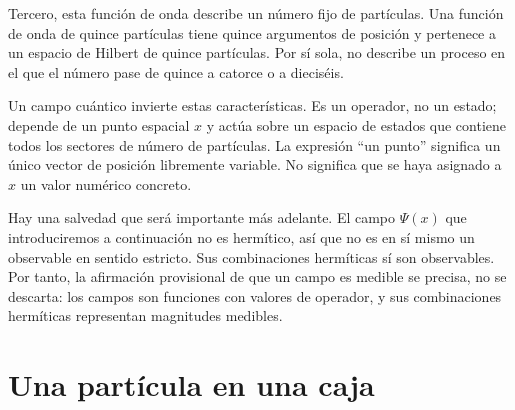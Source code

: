 Tercero, esta función de onda describe un número fijo de partículas. Una función de onda de quince partículas tiene quince argumentos de posición y pertenece a un espacio de Hilbert de quince partículas. Por sí sola, no describe un proceso en el que el número pase de quince a catorce o a dieciséis.

Un campo cuántico invierte estas características. Es un operador, no un estado; depende de un punto espacial \(x\) y actúa sobre un espacio de estados que contiene todos los sectores de número de partículas. La expresión ``un punto'' significa un único vector de posición libremente variable. No significa que se haya asignado a \(x\) un valor numérico concreto.

Hay una salvedad que será importante más adelante. El campo \(\Psi(x)\) que introduciremos a continuación no es hermítico, así que no es en sí mismo un observable en sentido estricto. Sus combinaciones hermíticas sí son observables. Por tanto, la afirmación provisional de que un campo es medible se precisa, no se descarta: los campos son funciones con valores de operador, y sus combinaciones hermíticas representan magnitudes medibles.

\begin{classroomqa}
\end{classroomqa}

\begin{classroomqa}
\end{classroomqa}

\section{Una partícula en una caja}

